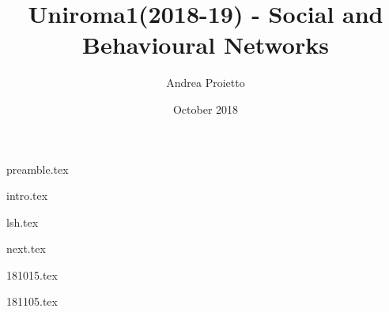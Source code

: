 \documentclass{report}
\title{Uniroma1(2018-19) - Social and Behavioural Networks}
\author{Andrea Proietto}
\date{October 2018}
\begin{document}
\maketitle

\tableofcontents

{preamble.tex}

{intro.tex}
	
{lsh.tex}

{next.tex}

{181015.tex}

{181105.tex}
\end{document}
